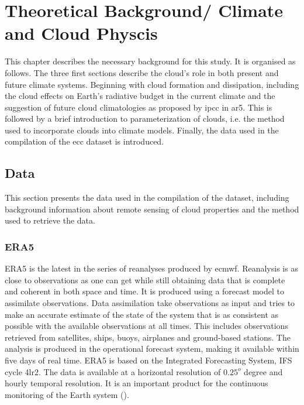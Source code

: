 \setcounter{chapter}{1} 
\chapter{Theoretical Background/ Climate and Cloud Physcis} \label{ch:theoretical_back}
This chapter describes the necessary background for this study. It is organised as follows. The three first sections describe the cloud's role in both present and future climate systems. Beginning with cloud formation and dissipation, including the cloud effects on Earth's radiative budget in the current climate and the suggestion of future cloud climatologies as proposed by \acrshort{ipcc} in \acrshort{ar5}. This is followed by a brief introduction to parameterization of clouds, i.e. the method used to incorporate clouds into climate models.
Finally, the data used in the compilation of the \acrshort{ecc} dataset is introduced. 





\section{Data}
This section presents the data used in the compilation of the dataset, including background information about remote sensing of cloud properties and the method used to retrieve the data. 

\subsection{ERA5} \label{sec:era5}
ERA5 is the latest in the series of reanalyses produced by \acrfull{ecmwf}. Reanalysis is as close to observations as one can get while still obtaining data that is complete and coherent in both space and time. It is produced using a forecast model to assimilate observations. Data assimilation take observations as input and tries to make an accurate estimate of the state of the system that is as consistent as possible with the available observations at all times. This includes observations retrieved from satellites, ships, buoys, airplanes and ground-based stations. The analysis is produced in the operational forecast system, making it available within five days of real time. ERA5 is based on the Integrated Forecasting System, IFS cycle 4lr2. The data is available at a horizontal resolution of $0.25^o$ degree and hourly temporal resolution. It is an important product for the continuous monitoring of the Earth system (\cite{Hersbach2018OperationalStatus}).

